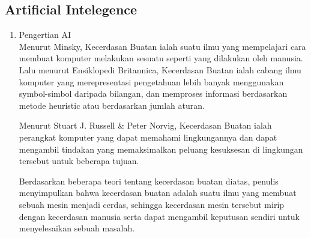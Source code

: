 \subsection{Artificial Intelegence}
\begin{enumerate}
	\item Pengertian AI\\
	Menurut Minsky, Kecerdasan Buatan ialah suatu ilmu yang mempelajari cara membuat 			komputer melakukan sesuatu seperti yang dilakukan oleh manusia. Lalu menurut Ensiklopedi Britannica, Kecerdasan Buatan ialah cabang ilmu komputer yang merepresentasi pengetahuan lebih banyak menggunakan symbol-simbol daripada bilangan, dan memproses informasi berdasarkan metode heuristic atau berdasarkan jumlah aturan.

	Menurut Stuart J. Russell & Peter Norvig, Kecerdasan Buatan ialah perangkat komputer yang dapat memahami lingkungannya dan dapat mengambil tindakan yang memaksimalkan peluang kesuksesan di lingkungan tersebut untuk beberapa tujuan.

Berdasarkan beberapa teori tentang kecerdasan buatan diatas, penulis menyimpulkan bahwa kecerdasan buatan adalah suatu ilmu yang membuat sebuah mesin menjadi cerdas, sehingga kecerdasan mesin tersebut mirip dengan kecerdasan manusia serta dapat mengambil keputusan sendiri untuk menyelesaikan sebuah masalah.


\end{enumerate}
